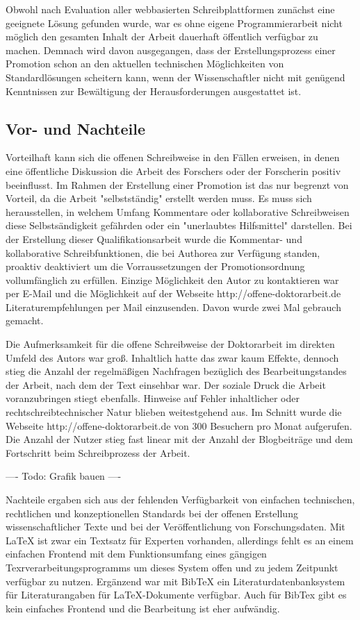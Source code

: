 Obwohl nach Evaluation aller webbasierten Schreibplattformen zunächst eine geeignete Lösung gefunden wurde, war es ohne eigene Programmierarbeit nicht möglich den gesamten Inhalt der Arbeit dauerhaft öffentlich verfügbar zu machen. Demnach wird davon ausgegangen, dass der Erstellungsprozess einer Promotion schon an den aktuellen technischen Möglichkeiten von Standardlösungen scheitern kann, wenn der Wissenschaftler nicht mit genügend Kenntnissen zur Bewältigung der Herausforderungen ausgestattet ist.

\subsection{Vor- und Nachteile}

Vorteilhaft kann sich die offenen Schreibweise in den Fällen erweisen, in denen eine öffentliche Diskussion die Arbeit des Forschers oder der Forscherin positiv beeinflusst. Im Rahmen der Erstellung einer Promotion ist das nur begrenzt von Vorteil, da die Arbeit "selbstständig" erstellt werden muss. Es muss sich herausstellen, in welchem Umfang Kommentare oder kollaborative Schreibweisen diese Selbstsändigkeit gefährden oder ein "unerlaubtes Hilfsmittel" darstellen. Bei der Erstellung dieser Qualifikationsarbeit wurde die Kommentar- und kollaborative Schreibfunktionen, die bei Authorea zur Verfügung standen, proaktiv deaktiviert um die Vorraussetzungen der Promotionsordnung vollumfänglich zu erfüllen. Einzige Möglichkeit den Autor zu kontaktieren war per E-Mail und die Möglichkeit auf der Webseite http://offene-doktorarbeit.de Literaturempfehlungen per Mail einzusenden. Davon wurde zwei Mal gebrauch gemacht.

Die Aufmerksamkeit für die offene Schreibweise der Doktorarbeit im direkten Umfeld des Autors war groß. Inhaltlich hatte das zwar kaum Effekte, dennoch stieg die Anzahl der regelmäßigen Nachfragen bezüglich des Bearbeitungstandes der Arbeit, nach dem der Text einsehbar war. Der soziale Druck die Arbeit voranzubringen stiegt ebenfalls. Hinweise auf Fehler inhaltlicher oder rechtschreibtechnischer Natur blieben weitestgehend aus. Im Schnitt wurde die Webseite http://offene-doktorarbeit.de von 300 Besuchern pro Monat aufgerufen. Die Anzahl der Nutzer stieg fast linear mit der Anzahl der Blogbeiträge und dem Fortschritt beim Schreibprozess der Arbeit.

---- Todo: Grafik bauen ----

Nachteile ergaben sich aus der fehlenden Verfügbarkeit von einfachen technischen, rechtlichen und konzeptionellen Standards bei der offenen Erstellung wissenschaftlicher Texte und bei der Veröffentlichung von Forschungsdaten. Mit LaTeX ist zwar ein Textsatz für Experten vorhanden, allerdings fehlt es an einem einfachen Frontend mit dem Funktionsumfang eines gängigen Texrverarbeitungsprogramms um dieses System offen und zu jedem Zeitpunkt verfügbar zu nutzen. Ergänzend war mit BibTeX ein Literaturdatenbanksystem für Literaturangaben für LaTeX-Dokumente verfügbar. Auch für BibTex gibt es kein einfaches Frontend und die Bearbeitung ist eher aufwändig. 

